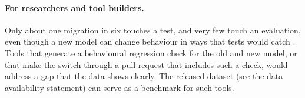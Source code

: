 \paragraph{For researchers and tool builders.} Only about one migration in six touches a test, and very few touch an evaluation, even though a new model can change behaviour in ways that tests would catch \citep{ma2024prompt}. Tools that generate a behavioural regression check for the old and new model, or that make the switch through a pull request that includes such a check, would address a gap that the data shows clearly. The released dataset (see the data availability statement) can serve as a benchmark for such tools.
